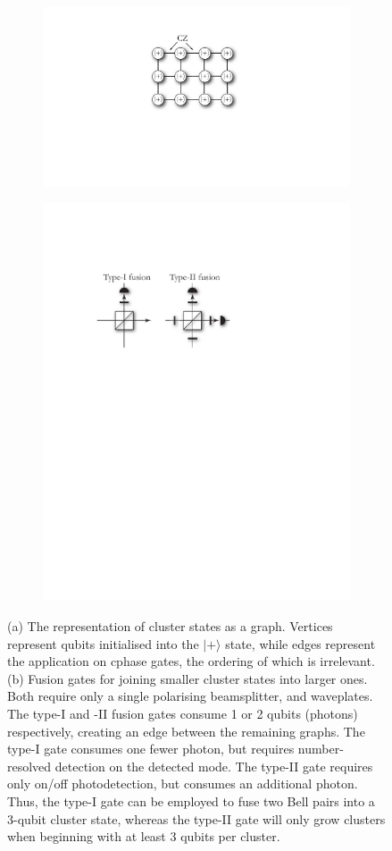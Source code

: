 \documentclass[times,final]{elsarticle}
\newcommand{\ket}[1]{|#1\rangle}
\begin{document}
\begin{figure}
\centering
\begin{subfigure}{.5\columnwidth}
  \centering
  \includegraphics[width=.5\columnwidth]{cluster_state}
  \caption{}
  \label{fig:cluster}
\end{subfigure}%
\begin{subfigure}{.5\columnwidth}
  \centering
  \includegraphics[width=.7\columnwidth]{fusion}
  \caption{}
  \label{fig:fusion}
\end{subfigure}
\caption{(a) The representation of cluster states as a graph. Vertices represent qubits initialised into the $\ket{+}$ state, while edges represent the application on {\sc cphase} gates, the ordering of which is irrelevant. (b) Fusion gates for joining smaller cluster states into larger ones. Both require only a single polarising beamsplitter, and waveplates. The type-I and -II fusion gates consume 1 or 2 qubits (photons) respectively, creating an edge between the remaining graphs. The type-I gate consumes one fewer photon, but requires number-resolved detection on the detected mode. The type-II gate requires only on/off photodetection, but consumes an additional photon. Thus, the type-I gate can be employed to fuse two Bell pairs into a 3-qubit cluster state, whereas the type-II gate will only grow clusters when beginning with at least 3 qubits per cluster. }
\label{fig:test}
\end{figure}
\end{document}

